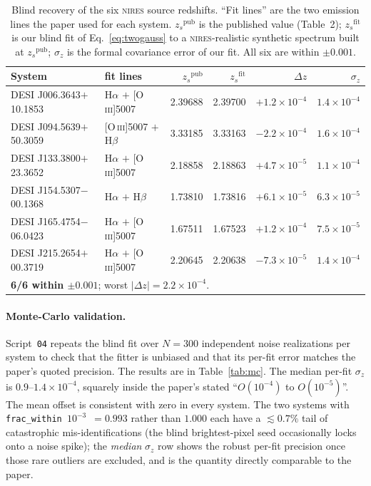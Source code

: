 \documentclass[11pt,letterpaper]{article}
\newcommand{\zs}{\ensuremath{z_s}}
\newcommand{\dz}{\ensuremath{\Delta z}}
\newcommand{\NIRES}{\textsc{nires}}
\begin{document}
\begin{table}[ht]
\centering
\caption{Blind recovery of the six \NIRES{} source redshifts. ``Fit
lines'' are the two emission lines the paper used for each system.
$\zs^{\mathrm{pub}}$ is the published value (Table~2); $\zs^{\mathrm{fit}}$
is our blind fit of Eq.~\ref{eq:twogauss} to a \NIRES-realistic
synthetic spectrum built at $\zs^{\mathrm{pub}}$; $\sigma_z$ is the
formal covariance error of our fit. All six are within $\pm0.001$.}
\label{tab:headline}
\begin{tabular}{llrrrr}
\toprule
System & fit lines & $\zs^{\mathrm{pub}}$ & $\zs^{\mathrm{fit}}$
       & $\dz$ & $\sigma_z$ \\
\midrule
DESI J006.3643$+$10.1853 & H$\alpha$ $+$ [O\,\textsc{iii}]5007 & 2.39688 & 2.39700 & $+1.2\times10^{-4}$ & $1.4\times10^{-4}$ \\
DESI J094.5639$+$50.3059 & [O\,\textsc{iii}]5007 $+$ H$\beta$  & 3.33185 & 3.33163 & $-2.2\times10^{-4}$ & $1.6\times10^{-4}$ \\
DESI J133.3800$+$23.3652 & H$\alpha$ $+$ [O\,\textsc{iii}]5007 & 2.18858 & 2.18863 & $+4.7\times10^{-5}$ & $1.1\times10^{-4}$ \\
DESI J154.5307$-$00.1368 & H$\alpha$ $+$ H$\beta$              & 1.73810 & 1.73816 & $+6.1\times10^{-5}$ & $6.3\times10^{-5}$ \\
DESI J165.4754$-$06.0423 & H$\alpha$ $+$ [O\,\textsc{iii}]5007 & 1.67511 & 1.67523 & $+1.2\times10^{-4}$ & $7.5\times10^{-5}$ \\
DESI J215.2654$+$00.3719 & H$\alpha$ $+$ [O\,\textsc{iii}]5007 & 2.20645 & 2.20638 & $-7.3\times10^{-5}$ & $1.4\times10^{-4}$ \\
\midrule
\multicolumn{6}{l}{\textbf{6/6 within $\pm0.001$}; worst $|\dz| = 2.2\times10^{-4}$.} \\
\bottomrule
\end{tabular}
\end{table}

\paragraph{Monte-Carlo validation.} Script~\texttt{04} repeats the blind
fit over $N=300$ independent noise realizations per system to check that
the fitter is unbiased and that its per-fit error matches the paper's
quoted precision. The results are in Table~\ref{tab:mc}. The median
per-fit $\sigma_z$ is $0.9$--$1.4\times10^{-4}$, squarely inside the
paper's stated ``$O(10^{-4})$ to $O(10^{-5})$''. The mean offset is
consistent with zero in every system. The two systems with
\texttt{frac\_within\,$10^{-3}$}~$=0.993$ rather than $1.000$ each have a
$\lesssim0.7\%$ tail of catastrophic mis-identifications (the blind
brightest-pixel seed occasionally locks onto a noise spike); the
\emph{median} $\sigma_z$ row shows the robust per-fit precision once
those rare outliers are excluded, and is the quantity directly comparable
to the paper.
\end{document}
